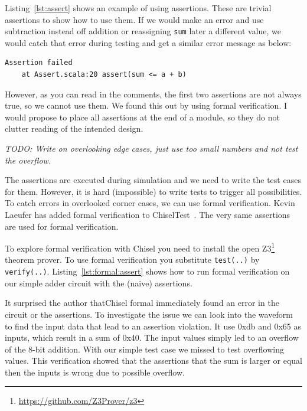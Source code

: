 \documentclass[%
    10pt,
    headinclude, footexclude,
    openright, %
    notitlepage,
    cleardoubleempty,
    headsepline,
    pointlessnumbers,
    bibtotoc, idxtotoc,
    ]{scrbook}
\newcommand{\code}[1]{{\lstinline[basicstyle=\small\ttfamily]{#1}}}
\newcommand{\todo}[1]{{\emph{TODO: #1}}}
\newcommand{\myref}[2]{\href{#1}{#2}}
\renewcommand{\myref}[2]{{#2}{\footnote{\url{#1}}}}
\begin{document}

Listing~\ref{lst:assert} shows an example of using assertions. These are trivial assertions
to show how to use them. If we would make an error and use subtraction instead off addition
or reassigning \code{sum} later a different value,
we would catch that error during testing and get a similar error message as below:

\begin{verbatim}
Assertion failed
    at Assert.scala:20 assert(sum <= a + b)
\end{verbatim}

However, as you can read in the comments, the first two assertions
are not always true, so we cannot use them. We found this out by
using formal verification.
I would propose to place all assertions at the end of a module,
so they do not clutter reading of the intended design.

\todo{Write on overlooking edge cases, just use too small numbers and not
test the overflow.}

The assertions are executed during simulation and we need to write the test cases
for them. However, it is hard (impossible) to write tests to trigger all possibilities.
To catch errors in overlooked corner cases, we can use formal verification.
Kevin Laeufer has added formal verification to ChiselTest~\cite{kevin:formal:woset2021}.
The very same assertions are used for formal verification.

To explore formal verification with Chisel you need to install
the open \myref{https://github.com/Z3Prover/z3}{Z3} theorem prover.
To use formal verification you substitute \code{test(..)} by \code{verify(..)}.
Listing~\ref{lst:formal:assert} shows how to run formal verification on our
simple adder circuit with the (naive) assertions.

It surprised the author thatChisel formal immediately found an error in the circuit or the assertions.
To investigate the issue we can look into the waveform to find the input data
that lead to an assertion violation. It use 0xdb and 0x65 as inputs, which result in
a sum of 0x40. The input values simply led to an overflow of the 8-bit addition.
With our simple test case we missed to test overflowing values.
This verification showed that the assertions that the sum is larger or equal then
the inputs is wrong due to possible overflow.

\end{document}
